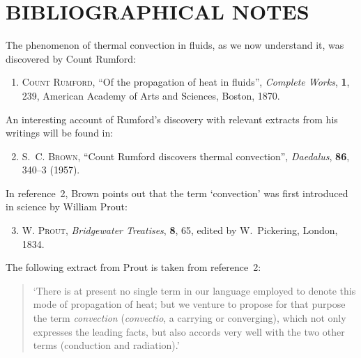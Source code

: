 
\section*{BIBLIOGRAPHICAL NOTES}

The phenomenon of thermal convection in fluids, as we now understand it, was
discovered by Count Rumford:

\begin{enumerate}

\item \textsc{Count Rumford}, ``Of the propagation of heat in fluids'',
  \textit{Complete Works}, \textbf{1}, 239, American Academy of Arts and Sciences,
  Boston, 1870.

\end{enumerate}

\noindent An interesting account of Rumford's discovery with relevant extracts from his
writings will be found in:

\begin{enumerate}
\setcounter{enumi}{1}

\item S.~C. \textsc{Brown}, ``Count Rumford discovers thermal convection'',
  \textit{Daedalus}, \textbf{86}, 340--3 (1957).

\end{enumerate}

\noindent In reference~2, Brown points out that the term `convection' was first introduced
in science by William Prout:

\begin{enumerate}
\setcounter{enumi}{2}

\item W. \textsc{Prout}, \textit{Bridgewater Treatises}, \textbf{8}, 65, edited
  by W.~Pickering, London, 1834.

\end{enumerate}

\noindent The following extract from Prout is taken from reference~2:

\begin{quote}
`There is at present no single term in our language employed to denote this
mode of propagation of heat; but we venture to propose for that purpose the
term \textit{convection} (\textit{convectio}, a carrying or converging), which
not only expresses the leading facts, but also accords very well with the two
other terms (conduction and radiation).'
\end{quote}

